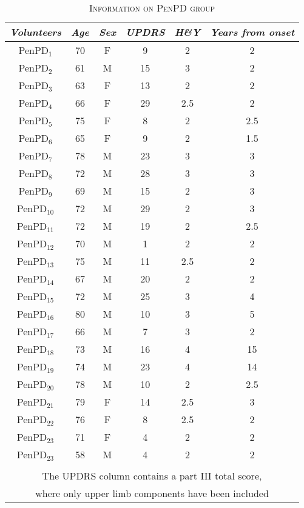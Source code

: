 \begin{table}[!hp]
\centering
\caption{\textsc{Information on PenPD group}}
\begin{tabular*}{0.7\textwidth}{@{\extracolsep{\fill}} c c c c c c }
	\textit{Volunteers} & \textit{Age} & \textit{Sex} & \textit{UPDRS} & \textit{H\&Y} & \textit{Years from onset} \\
	\hline 	\hline 
 	\gls{PenPD}$_{1}$ & 70 & F & 9 & 2 & 2 \\
 	\gls{PenPD}$_{2}$ & 61 & M & 15 & 3 & 2 \\
 	\gls{PenPD}$_{3}$ & 63 & F & 13 & 2 & 2 \\
 	\gls{PenPD}$_{4}$ & 66 & F & 29 & 2.5 & 2 \\
 	\gls{PenPD}$_{5}$ & 75 & F & 8 & 2 & 2.5 \\
 	\gls{PenPD}$_{6}$ & 65 & F & 9 & 2 & 1.5 \\
 	\gls{PenPD}$_{7}$ & 78 & M & 23 & 3 & 3 \\
 	\gls{PenPD}$_{8}$ & 72 & M & 28 & 3 & 3 \\
 	\gls{PenPD}$_{9}$ & 69 & M & 15 & 2 & 3 \\
 	\gls{PenPD}$_{10}$ & 72 & M & 29 & 2 & 3 \\
 	\gls{PenPD}$_{11}$ & 72 & M & 19 & 2 & 2.5 \\
 	\gls{PenPD}$_{12}$ & 70 & M & 1 & 2 & 2 \\
 	\gls{PenPD}$_{13}$ & 75 & M & 11 & 2.5 & 2 \\
 	\gls{PenPD}$_{14}$ & 67 & M & 20 & 2 & 2 \\
 	\gls{PenPD}$_{15}$ & 72 & M & 25 & 3 & 4 \\
 	\gls{PenPD}$_{16}$ & 80 & M & 10 & 3 & 5 \\
 	\gls{PenPD}$_{17}$ & 66 & M & 7 & 3 & 2 \\
 	\gls{PenPD}$_{18}$ & 73 & M & 16 & 4 & 15 \\
 	\gls{PenPD}$_{19}$ & 74 & M & 23 & 4 & 14 \\
 	\gls{PenPD}$_{20}$ & 78 & M & 10 & 2 & 2.5 \\
 	\gls{PenPD}$_{21}$ & 79 & F & 14 & 2.5 & 3 \\
 	\gls{PenPD}$_{22}$ & 76 & F & 8 & 2.5 & 2 \\
 	\gls{PenPD}$_{23}$ & 71 & F & 4 & 2 & 2 \\
 	\gls{PenPD}$_{23}$ & 58 & M & 4 & 2 & 2 \\
 	& & & & & \\
	\multicolumn{6}{c}{The \gls{UPDRS} column contains a part III total score,} \\
	\multicolumn{6}{c}{where only upper limb components have been included} \\
\end{tabular*}
\label{table:demoPenCT2}
\end{table}

